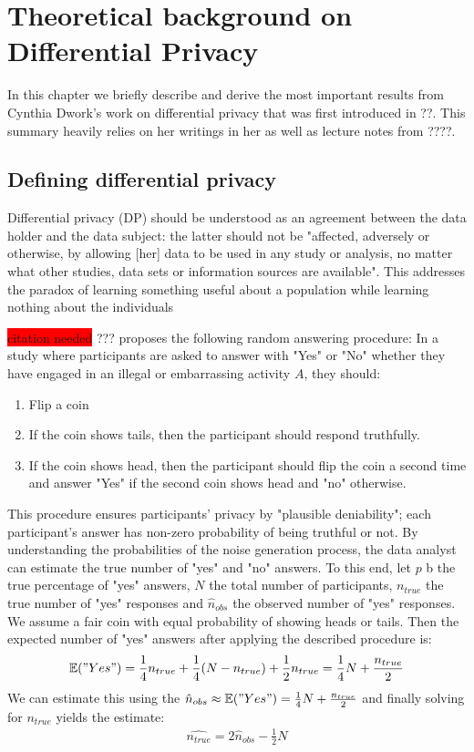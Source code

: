 \section{Theoretical background on Differential Privacy} \label{ch2}

In this chapter we briefly describe and derive the most important results from Cynthia Dwork's work on differential privacy that was first introduced in ??. This summary heavily relies on her writings in her as well as lecture notes from ????.

\subsection{Defining differential privacy}
Differential privacy (DP) should be understood as an agreement between the data holder and the data subject: the latter should not be "affected, adversely or otherwise, by allowing [her] data to be used in any study or analysis, no matter what other studies, data sets or information sources are available". This addresses the paradox of learning something useful about a population while learning nothing about the individuals


\begin{ex}
    \colorbox{red}{citation needed} ??? proposes the following random answering procedure: In a study where participants are asked to answer with "Yes" or "No" whether they have engaged in an illegal or embarrassing activity $A$, they should:
    \begin{enumerate}
        \item Flip a coin
        \item If the coin shows tails, then the participant should respond truthfully.
        \item If the coin shows head, then the participant should flip the coin a second time and answer "Yes" if the second coin shows head and "no" otherwise.
    \end{enumerate}
    This procedure ensures participants' privacy by "plausible deniability"; each participant's answer has non-zero probability of being truthful or not. By understanding the probabilities of the noise generation process, the data analyst can estimate the true number of "yes" and "no" answers. To this end, let $p$ b the true percentage of "yes" answers, $N$ the total number of participants, $n_{true}$ the true number of "yes" responses and $\hat{n}_{obs}$ the observed number of "yes" responses. We assume a fair coin with equal probability of showing heads or tails. Then the expected number of "yes" answers after applying the described procedure is:
    \begin{align}
        \mathbb{E}("Yes") = \frac{1}{4} n_{true} + \frac{1}{4} (N-n_{true}) + \frac{1}{2} n_{true} = \frac{1}{4} N + \frac{n_{true}}{2}
    \end{align}
    We can estimate this using the $\hat{n}_{obs} \approx \mathbb{E}("Yes") = \frac{1}{4} N + \frac{n_{true}}{2}$ and finally solving for $n_{true}$ yields the estimate:
    \begin{align}
        \hat{n_{true}} = 2 \hat{n}_{obs} - \frac{1}{2} N
    \end{align}
\end{ex}



